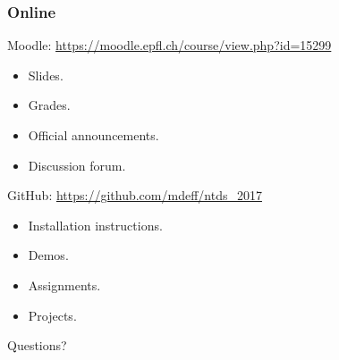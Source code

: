 \documentclass{beamer}
\begin{document}

\begin{frame}
	\frametitle{Online}
	Moodle: {\small \url{https://moodle.epfl.ch/course/view.php?id=15299}}
	\begin{itemize}
		\item Slides.
		\item Grades.
		\item Official announcements.
		\item Discussion forum.
	\end{itemize}
	\vspace{1em}
	GitHub: {\small \url{https://github.com/mdeff/ntds_2017}}
	\begin{itemize}
		\item Installation instructions.
		\item Demos.
		\item Assignments.
		\item Projects.
	\end{itemize}
	\vfill
	\begin{center}
		\Huge Questions?
	\end{center}
\end{frame}

\end{document}
